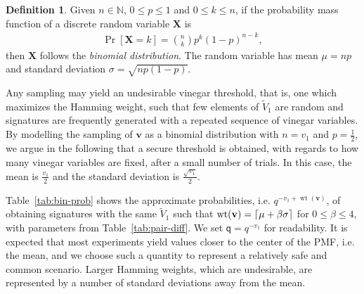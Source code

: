 \documentclass[12pt, a4paper, oneside]{memoir}
\DeclareMathOperator*{\wt}{wt}
\DeclarePairedDelimiter{\ceil}{\lceil}{\rceil}
\theoremstyle{definition}
\newtheorem{definition}[theorem]{Definition}
\begin{document}
\begin{definition}
  Given $n \in \mathbb{N}$, $0 \leq p \leq 1$ and $0 \leq k \leq n$, if the probability mass function of a discrete random variable $\mathbf{X}$ is
  \begin{align}
    \Pr[\mathbf{X} = k] = \binom{n}{k} p^{k} (1 - p)^{n - k},
  \end{align}
  then $\mathbf{X}$ follows the \emph{binomial distribution}. The random variable has mean $\mu = np$ and standard deviation $\sigma = \sqrt{np(1 - p)}$.
\end{definition}

Any sampling may yield an undesirable vinegar threshold, that is, one which maximizes the Hamming weight, such that few elements of $\widetilde{V}_{1}$ are random and signatures are frequently generated with a repeated sequence of vinegar variables. By modelling the sampling of $\mathbf{v}$ as a binomial distribution with $n = v_{1}$ and $p = \frac{1}{2}$, we argue in the following that a secure threshold is obtained, with regards to how many vinegar variables are fixed, after a small number of trials. In this case, the mean is $\frac{v_{1}}{2}$ and the standard deviation is $\frac{\sqrt{v_{1}}}{2}$.

Table~\ref{tab:bin-prob} shows the approximate probabilities, i.e. $q^{-v_{1} + \wt(\mathbf{v})}$, of obtaining signatures with the same $\widetilde{V}_{1}$ such that $\wt(\mathbf{v}) = \ceil{\mu + \beta \sigma}$ for $0 \leq \beta \leq 4$, with parameters from Table~\ref{tab:pair-diff}. We set $\mathsf{q} = q^{-v_{1}}$ for readability. It is expected that most experiments yield values closer to the center of the PMF, i.e. the mean, and we choose such a quantity to represent a relatively safe and common scenario. Larger Hamming weights, which are undesirable, are represented by a number of standard deviations away from the mean.
\end{document}
